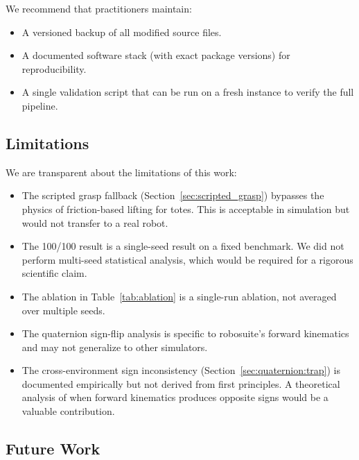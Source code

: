 We recommend that practitioners maintain:
\begin{itemize}[leftmargin=*,itemsep=2pt]
    \item A versioned backup of all modified source files.
    \item A documented software stack (with exact package versions) for reproducibility.
    \item A single validation script that can be run on a fresh instance to verify the full pipeline.
\end{itemize}

\subsection{Limitations}
\label{sec:discussion:limitations}

We are transparent about the limitations of this work:
\begin{itemize}[leftmargin=*,itemsep=2pt]
    \item The scripted grasp fallback (Section~\ref{sec:scripted_grasp}) bypasses the physics of friction-based lifting for totes. This is acceptable in simulation but would not transfer to a real robot.
    \item The 100/100 result is a single-seed result on a fixed benchmark. We did not perform multi-seed statistical analysis, which would be required for a rigorous scientific claim.
    \item The ablation in Table~\ref{tab:ablation} is a single-run ablation, not averaged over multiple seeds.
    \item The quaternion sign-flip analysis is specific to robosuite's forward kinematics and may not generalize to other simulators.
    \item The cross-environment sign inconsistency (Section~\ref{sec:quaternion:trap}) is documented empirically but not derived from first principles. A theoretical analysis of when forward kinematics produces opposite signs would be a valuable contribution.
\end{itemize}

\subsection{Future Work}
\label{sec:discussion:future}

